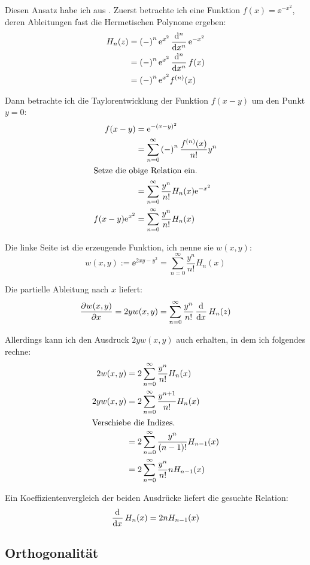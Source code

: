 Diesen Ansatz habe ich aus \cite{koeppel-hermite_beiblatt}. Zuerst betrachte
ich eine Funktion $f(x) = \ee^{-x^2}$, deren Ableitungen fast die Hermetischen
Polynome ergeben:
\begin{align*}
	H_n(z)
	&= \del-^n \ee^{x^2} \dod[n]{}x \ee^{-x^2} \\
	&= \del-^n \ee^{x^2} \dod[n]{}x f(x) \\
	&= \del-^n \ee^{x^2} f^{(n)}(x)
\end{align*}

Dann betrachte ich die Taylorentwicklung der Funktion $f(x - y)$ um den Punkt
$y = 0$:
\begin{align*}
	f(x - y)
	&= \ee^{-(x-y)^2} \\
	&= \sum_{n=0}^\infty \del-^n \frac{f^{(n)}(x)}{n!} y^n \\
	\intertext{%
		Setze die obige Relation ein.
	}
	&= \sum_{n=0}^\infty \frac{y^n}{n!} H_n(x) \ee^{-x^2} \\
	f(x-y) \ee^{x^2} 
	&= \sum_{n=0}^\infty \frac{y^n}{n!} H_n(x)
\end{align*}

Die linke Seite ist die erzeugende Funktion, ich nenne sie $w(x, y)$:
\[
	w(x, y) := \ee^{2xy-y^2} = \sum_{n=0}^\infty \frac{y^n}{n!} H_n(x)
\]

Die partielle Ableitung nach $x$ liefert:
\[
	\dpd{w(x, y)}x = 2 y w(x, y)
	= \sum_{n=0}^\infty \frac{y^n}{n!} \dod{}x H_n(z)
\]

Allerdings kann ich den Ausdruck $2 y w(x, y)$ auch erhalten, in dem ich
folgendes rechne:
\begin{align*}
	2 w(x, y)
	&= 2 \sum_{n=0}^\infty \frac{y^n}{n!} H_n(x) \\
	2 y w(x, y)
	&= 2 \sum_{n=0}^\infty \frac{y^{n+1}}{n!} H_n(x) \\
	\intertext{%
		Verschiebe die Indizes.
	}
	&= 2 \sum_{n=0}^\infty \frac{y^{n}}{(n-1)!} H_{n-1}(x) \\
	&= 2 \sum_{n=0}^\infty \frac{y^{n}}{n!} n H_{n-1}(x)
\end{align*}

Ein Koeffizientenvergleich der beiden Ausdrücke liefert die gesuchte Relation:
\[
	\dod{}x H_n(x) = 2n H_{n-1}(x)
\]

\subsection{Orthogonalität}

